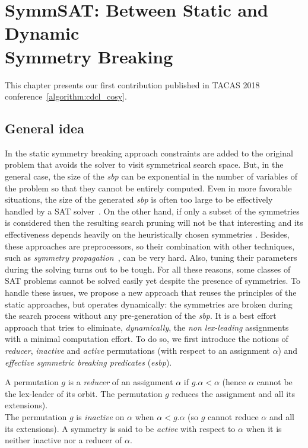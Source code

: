 \chapter{SymmSAT: Between Static and Dynamic\\ Symmetry Breaking}\label{chap:symmSAT}
\minitoc
This chapter presents our first contribution published in TACAS 2018 conference~\ref{algorithm:cdcl_cosy}. 
\section{General idea}
In the static symmetry breaking approach constraints are added to the original 
problem that avoids the solver to visit symmetrical search space.
But, in the general case,
the size of the \textit{sbp} can be exponential in the number of variables of
the problem so that they cannot be entirely computed. Even in more favorable
situations, the size of the generated \textit{sbp} is often too large to be
effectively handled by a SAT solver~\cite{Luks2004}. On the other hand, if
only a subset of the symmetries is considered then the resulting search pruning
will not be that interesting and its effectiveness depends heavily on the
heuristically chosen symmetries \cite{biere2009handbook}. Besides, these approaches
are preprocessors, so their combination with other techniques, such as
\emph{symmetry propagation}~\cite{Devriendt12}, can be very hard. Also, tuning
their parameters during the solving turns out to be tough. For all
these reasons, some classes of SAT problems cannot be solved easily yet despite
the presence of symmetries.
To handle these issues, we propose a new
approach that reuses the principles of the static approaches, but operates
dynamically: the symmetries are broken during the search process without any
pre-generation of the \textit{sbp}. It is a best effort approach that tries to eliminate,
\textit{dynamically}, the \textit{non lex-leading} assignments with a minimal
computation effort. To do so, we first introduce the notions of
\textit{reducer}, \textit{inactive} and \textit{active} permutations (with
respect to an assignment $\alpha$) and \emph{effective symmetric breaking predicates} (\emph{esbp}).
\begin{definition}
  A permutation $g$ is a \emph{reducer} of an assignment $\alpha$ if $g.\alpha < \alpha$ 
  (hence $\alpha$ cannot be the lex-leader of its orbit. The permutation  $g$ reduces the assignment and all its extensions).\\
 The permutation $g$ is \emph{inactive} on $\alpha$ when $\alpha < g.\alpha$ (so $g$ cannot reduce $\alpha$ and all
 its extensions). A symmetry is said to be \emph{active} with respect to $\alpha$
 when it is neither inactive nor a reducer of $\alpha$. 
\end{definition}
